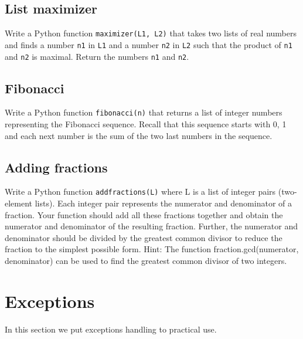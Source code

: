 \subsection{List maximizer}

Write a Python function {\tt maximizer(L1, L2)} that takes two lists of real numbers and 
finds a number {\tt n1} in {\tt L1} and a number {\tt n2} in {\tt L2} such that the product 
of {\tt n1} and {\tt n2} is maximal. Return the numbers {\tt n1} and {\tt n2}.


\subsection{Fibonacci}

Write a Python function {\tt fibonacci(n)} that returns a list of integer numbers representing 
the Fibonacci sequence. Recall that this sequence starts with 0, 1 and each next number is the 
sum of the two last numbers in the sequence. 


\subsection{Adding fractions}

Write a Python function {\tt addfractions(L)} where L is a list of integer pairs (two-element lists). Each integer pair represents the numerator and denominator of a fraction. Your function should add all these fractions together and obtain the numerator and denominator of the resulting fraction. Further, the numerator and denominator should be divided by the greatest common divisor to reduce the fraction to the simplest possible form. Hint: The function fraction.gcd(numerator, denominator) can be used to find the greatest common divisor of two integers.


\section{Exceptions}

In this section we put exceptions handling to practical use.

